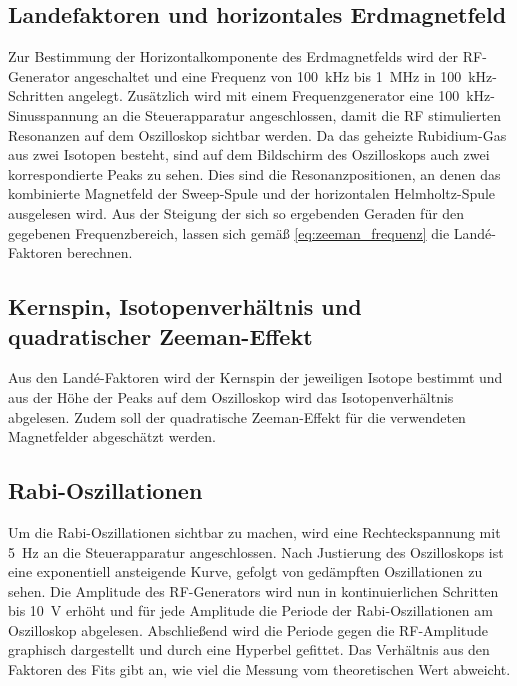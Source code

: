 \subsection{Landefaktoren und horizontales Erdmagnetfeld}
Zur Bestimmung der Horizontalkomponente des Erdmagnetfelds wird der RF-Generator angeschaltet und eine Frequenz von \SI{100}{\kilo\hertz} bis \SI{1}{\mega\hertz} in \SI{100}{\kilo\hertz}-Schritten angelegt.
Zusätzlich wird mit einem Frequenzgenerator eine \SI{100}{\kilo\hertz}-Sinusspannung an die Steuerapparatur angeschlossen, damit die RF stimulierten Resonanzen auf dem Oszilloskop sichtbar werden.
Da das geheizte Rubidium-Gas aus zwei Isotopen besteht, sind auf dem Bildschirm des Oszilloskops auch zwei korrespondierte Peaks zu sehen.
Dies sind die Resonanzpositionen, an denen das kombinierte Magnetfeld der Sweep-Spule und der horizontalen Helmholtz-Spule ausgelesen wird.
Aus der Steigung der sich so ergebenden Geraden für den gegebenen Frequenzbereich, lassen sich gemäß \autoref{eq:zeeman_frequenz} die Landé-Faktoren berechnen.
\subsection{Kernspin, Isotopenverhältnis und quadratischer Zeeman-Effekt}
Aus den Landé-Faktoren wird der Kernspin der jeweiligen Isotope bestimmt und aus der Höhe der Peaks auf dem Oszilloskop wird das Isotopenverhältnis abgelesen.
Zudem soll der quadratische Zeeman-Effekt für die verwendeten Magnetfelder abgeschätzt werden.
\subsection{Rabi-Oszillationen}
\label{sec:rabi}
Um die Rabi-Oszillationen sichtbar zu machen, wird eine Rechteckspannung mit \SI{5}{\hertz} an die Steuerapparatur angeschlossen.
Nach Justierung des Oszilloskops ist eine exponentiell ansteigende Kurve, gefolgt von gedämpften Oszillationen zu sehen.
Die Amplitude des RF-Generators wird nun in kontinuierlichen Schritten bis \SI{10}{\volt} erhöht und für jede Amplitude die Periode der Rabi-Oszillationen am Oszilloskop abgelesen.
Abschließend wird die Periode gegen die RF-Amplitude graphisch dargestellt und durch eine Hyperbel gefittet.
Das Verhältnis aus den Faktoren des Fits gibt an, wie viel die Messung vom theoretischen Wert abweicht.